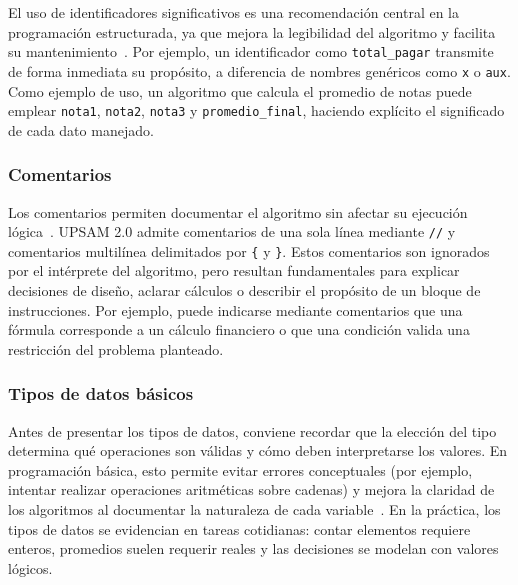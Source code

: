 \documentclass[12pt,twoside]{book}
\begin{document}
						El uso de identificadores significativos es una recomendación central en la programación estructurada, ya que mejora la legibilidad del algoritmo y facilita su mantenimiento~\cite{Martin2008Clean}. Por ejemplo, un identificador como \texttt{total\_pagar} transmite de forma inmediata su propósito, a diferencia de nombres genéricos como \texttt{x} o \texttt{aux}. Como ejemplo de uso, un algoritmo que calcula el promedio de notas puede emplear \texttt{nota1}, \texttt{nota2}, \texttt{nota3} y \texttt{promedio\_final}, haciendo explícito el significado de cada dato manejado.
						
					\subsubsection{Comentarios}
						\noindent
						Los comentarios permiten documentar el algoritmo sin afectar su ejecución lógica~\cite{Sebesta2018Concepts,Martin2008Clean}. UPSAM 2.0 admite comentarios de una sola línea mediante \texttt{//} y comentarios multilínea delimitados por \texttt{\{} y \texttt{\}}. Estos comentarios son ignorados por el intérprete del algoritmo, pero resultan fundamentales para explicar decisiones de diseño, aclarar cálculos o describir el propósito de un bloque de instrucciones. Por ejemplo, puede indicarse mediante comentarios que una fórmula corresponde a un cálculo financiero o que una condición valida una restricción del problema planteado.
						
					\subsubsection{Tipos de datos básicos}
						\noindent
						Antes de presentar los tipos de datos, conviene recordar que la elección del tipo determina qué operaciones son válidas y cómo deben interpretarse los valores. En programación básica, esto permite evitar errores conceptuales (por ejemplo, intentar realizar operaciones aritméticas sobre cadenas) y mejora la claridad de los algoritmos al documentar la naturaleza de cada variable~\cite{Farrell2018Programming,Gaddis2022Starting}. En la práctica, los tipos de datos se evidencian en tareas cotidianas: contar elementos requiere enteros, promedios suelen requerir reales y las decisiones se modelan con valores lógicos.
						
\end{document}
